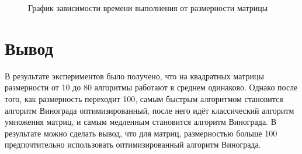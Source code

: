 \newpage

\begin{figure}[ph!]
	\caption{График зависимости времени выполнения от размерности матрицы}
\end{figure}

\section{Вывод}
В результате экспериментов было получено, что на квадратных матрицы размерности от 10 до 80 алгоритмы работают в среднем одинаково. Однако после того, как размерность переходит 100, самым быстрым алгоритмом становится алгоритм Винограда оптимизированный, после него идёт классический алгоритм умножения матриц, и самым медленным становится алгоритм Винограда. В результате можно сделать вывод, что для матриц, размерностью больше 100 предпочтительно использовать оптимизированный алгоритм Винограда.